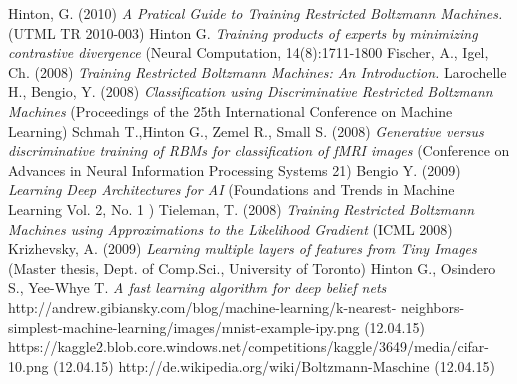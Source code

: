 \documentclass[a4paper]{scrartcl}
\begin{document}
\newpage

\begin{thebibliography}{9}
    Hinton, G. (2010) \emph{A Pratical Guide to Training Restricted 			Boltzmann Machines.} (UTML TR 2010-003)
    Hinton G. \emph{Training products of experts by minimizing contrastive divergence} (Neural Computation, 14(8):1711-1800
    Fischer, A., Igel, Ch. (2008) \emph{Training Restricted Boltzmann 		Machines: An Introduction.} 
    Larochelle H., Bengio, Y. (2008) \emph {Classification using 			Discriminative Restricted Boltzmann Machines} (Proceedings of the 25th International 			Conference on Machine Learning)
    Schmah T.,Hinton G., Zemel R., Small S. (2008) \emph{Generative 			versus discriminative training of RBMs
	for classification of fMRI images} (Conference on Advances in Neural Information 				Processing Systems 21)
    Bengio Y. (2009) \emph {Learning Deep Architectures for AI} 				(Foundations and Trends in Machine Learning
	Vol. 2, No. 1 )
    Tieleman, T. (2008) \emph{Training Restricted Boltzmann Machines 		using Approximations to
	the Likelihood Gradient} (ICML 2008)
	 Krizhevsky, A. (2009) \emph{Learning multiple layers of features 	from Tiny Images} (Master thesis, Dept. of Comp.Sci., University of 	Toronto)	
    Hinton G., Osindero S., Yee-Whye T. \emph {A fast learning 			algorithm for deep belief nets}
    http://andrew.gibiansky.com/blog/machine-learning/k-nearest-		neighbors-simplest-machine-learning/images/mnist-example-ipy.png (12.04.15)
    https://kaggle2.blob.core.windows.net/competitions/kaggle/3649/media/cifar-10.png (12.04.15)
    http://de.wikipedia.org/wiki/Boltzmann-Maschine (12.04.15)
   
\end{thebibliography}
\end{document}
